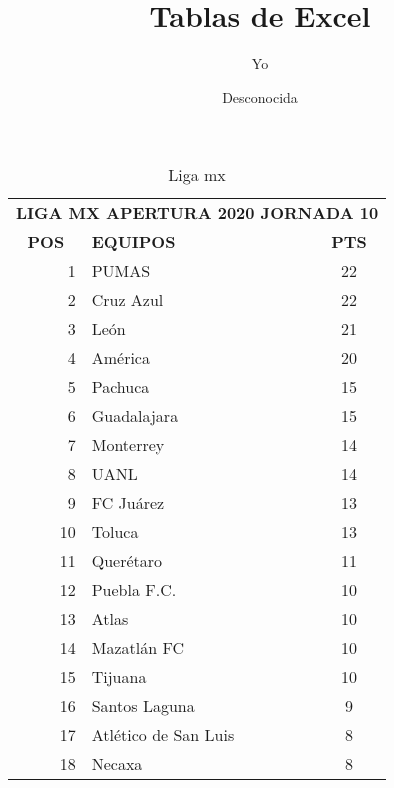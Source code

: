 \documentclass[11pt, letterpaper]{article}
\title{Tablas de Excel}
\author{Yo}
\date{Desconocida}
\begin{document}
\maketitle
\begin{table}[htbp]
    \centering
    \caption{Liga mx}
      \begin{tabular}{rp{5.39em}c}
      \multicolumn{3}{c}{\textbf{LIGA MX APERTURA 2020 JORNADA 10}} \\
      \multicolumn{1}{c}{\textbf{POS}} & \multicolumn{1}{l}{\textbf{EQUIPOS}} & \textbf{PTS} \\
      1     & PUMAS & 22 \\
      2     & Cruz Azul & 22 \\
      3     & León  & 21 \\
      4     & América & 20 \\
      5     & Pachuca & 15 \\
      6     & Guadalajara & 15 \\
      7     & Monterrey & 14 \\
      8     & UANL  & 14 \\
      9     & FC Juárez & 13 \\
      10    & Toluca & 13 \\
      11    & Querétaro & 11 \\
      12    & Puebla F.C. & 10 \\
      13    & Atlas & 10 \\
      14    & Mazatlán FC & 10 \\
      15    & Tijuana & 10 \\
      16    & Santos Laguna & 9 \\
      17    & Atlético de San Luis & 8 \\
      18    & Necaxa & 8 \\
      \end{tabular}%
    \label{tab:addlabel}%
  \end{table}%
\end{document}
